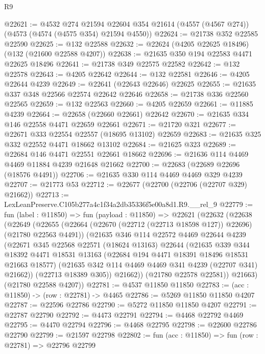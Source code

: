\begin{lexlean}{R9}
\begin{coremodule}
@22621 := @4532
    @274
    @21594
    @22604
    @354
    @21614
    (@4557 (@4567 @274))
    (@4573 (@4574 (@4575 @354) @21594 @4550))
@22624 := @21738 @352 @22585 @22590
@22625 := @132 @22588
@22632 := @22624 (@4205 @22625 @18496) (@132 (@21600 @22588 @4207))
@22638 := @21635 @350 @194 @22583 @4471 @22625 @18496
@22641 := @21738 @349 @22575 @22582
@22642 := @132 @22578
@22643 := @4205 @22642
@22644 := @132 @22581
@22646 := @4205 @22644 @4239
@22649 := @22641 (@22643 @22646) @22625
@22655 := @21635 @337 @348 @22566 @22574 @22642 @22646
@22658 := @21738 @336 @22560 @22565
@22659 := @132 @22563
@22660 := @4205 @22659
@22661 := @11885 @4239
@22664 := @22658 (@22660 @22661) @22642
@22670 := @21635 @334 @146 @22558 @4471 @22659 @22661
@22671 := @21720 @321
@22677 := @22671 @333 @22554 @22557 (@18695 @13102) @22659
@22683 := @21635 @325 @332 @22552 @4471 @18662 @13102
@22684 := @21625 @323
@22689 := @22684 @146 @4471 @22551 @22661 @18662
@22696 := @21636 @114 @4469 @4469 @11884 @4239 @21648 @21662
@22700 := @22683 (@22689 @22696 (@18576 @4491))
@22706 := @21635 @330 @114 @4469 @4469 @329 @4239
@22707 := @21773 @53
@22712 := @22677 (@22700 (@22706 (@22707 @329) @21662))
@22713 := LexLeanPreserve.C105b277a4c1f34a2db35336f5e00a8d1.R9.__rel_9
@22779 := fun (label : @11850) =>
  fun (payload : @11850) =>
  @22621
    (@22632
      (@22638
        (@22649
          (@22655
            (@22664 (@22670 (@22712 (@22713 @18598 @127)) @22696) (@21780 @22563 @4491))
            (@21635
              @346
              @114
              @22572
              @4469
              @22644
              @4239
              (@22671
                @345
                @22568
                @22571
                (@18624 @13163)
                @22644
                (@21635
                  @339
                  @344
                  @18392
                  @4471
                  @18531
                  @13163
                  (@22684 @194 @4471 @18391 @18496 @18531 @21663 @18577)
                  (@21635 @342 @114 @4469 @4469 @341 @4239 (@22707 @341) @21662))
                (@22713 @18389 @305))
              @21662))
          (@21780 @22578 @22581))
        @21663)
      (@21780 @22588 @4207))
@22781 := @4537 @11850 @11850
@22783 := (acc : @11850) -> (row : @22781) -> @4465
@22786 := @5269 @11850 @11850 @4207
@22787 := @22596 @22786
@22790 := @5272 @11850 @11850 @4207
@22791 := @22787 @22790
@22792 := @4473 @22791
@22794 := @4468 @22792 @4469
@22795 := @4470 @22794
@22796 := @4468 @22795
@22798 := @22600 @22786 @22790
@22799 := @21597 @22798
@22802 := fun (acc : @11850) => fun (row : @22781) => @22796 @22799

\end{coremodule}
\end{lexlean}
